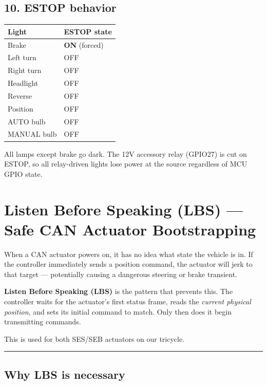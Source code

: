 \documentclass[12pt,a4paper,oneside]{report}
\begin{document}
\section{10. ESTOP behavior}\label{estop-behavior}

\begin{longtable}[]{@{}ll@{}}
\toprule\noalign{}
Light & ESTOP state \\
\midrule\noalign{}
\endhead
\bottomrule\noalign{}
\endlastfoot
Brake & \textbf{ON} (forced) \\
Left turn & OFF \\
Right turn & OFF \\
Headlight & OFF \\
Reverse & OFF \\
Position & OFF \\
AUTO bulb & OFF \\
MANUAL bulb & OFF \\
\end{longtable}

All lamps except brake go dark. The 12V accessory relay (GPIO27) is cut on
ESTOP, so all relay-driven lights lose power at the source regardless of MCU
GPIO state.


\chapter{Listen Before Speaking (LBS) --- Safe CAN Actuator
Bootstrapping}\label{listen-before-speaking-lbs-safe-can-actuator-bootstrapping}

When a CAN actuator powers on, it has no idea what state the vehicle is in. If
the controller immediately sends a position command, the actuator will jerk to
that target --- potentially causing a dangerous steering or brake transient.

\textbf{Listen Before Speaking (LBS)} is the pattern that prevents this. The
controller waits for the actuator's first status frame, reads the \emph{current
physical position}, and sets its initial command to match. Only then does it
begin transmitting commands.

This is used for both SES/SEB actuators on our tricycle.

\begin{center}\rule{0.5\linewidth}{0.5pt}\end{center}

\section{Why LBS is necessary}\label{why-lbs-is-necessary}
\end{document}
